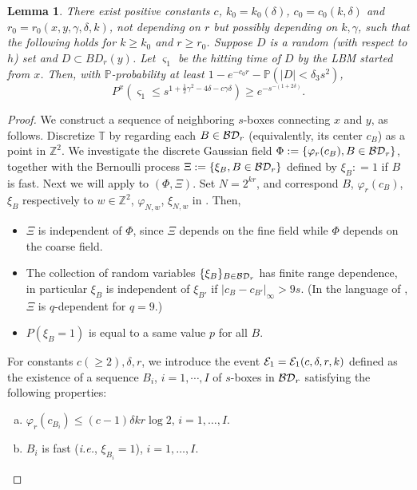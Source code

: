 \documentclass[11pt]{article}
\newtheorem{lemma}[theorem]{Lemma}
\theoremstyle{definition}
\def \BD {{\cal BD}}
\def \d {\delta}
\def \P {{\mathbb{P}}}
\def \T {{\mathbb{T}}}
\def \ee {{\cal E}}
\def \Z {{\mathbb{Z}}}
\begin{document}
 \begin{lemma} \label{Lemma.hitlastbox}
There exist positive constants
$c$, $k_0 = k_0 (\d)$,
$c_0 = c_0 (k, \d)$ and $r_0 = r_0 (x,y, \gamma, \d, k )$,
not depending on $r$ but possibly depending on $k,\gamma$,
such that the following holds for $k \ge k_0$ and $r \ge r_0$.
Suppose $D$ is a random (with respect to $h$) set and $D \subset BD_r (y)$.
Let $\varsigma_1$ be the hitting time of $D$ by the LBM started from $x$.
Then, with $\P$-probability at least $1 - e^{- c_0 r} - \P ( |D| < \d_3 s^2)$,
 \begin{equation} \label{Eq.theta1}
P^x ( \varsigma_1 \le s^{1 + \frac 1 2 \gamma^2 - 4 \d - c \gamma \d } )  \ge e^{- s^{-(1+2 \d ) }} .
 \end{equation}
 \end{lemma}
 \begin{proof}
We construct a sequence of neighboring $s$-boxes connecting $x$ and $y$, as follows. Discretize $\T$ by regarding each $B \in \BD_r$ (equivalently, its center $c_B$) as a point in $\Z^2$. We investigate the discrete Gaussian field $\Phi: = \{ \varphi_r (c_B), B \in \BD_r \}$, together with the Bernoulli process $\Xi : =\{ \xi_B, B \in \BD_r \}$ defined by $\xi_B : = 1$ if $B$ is fast. Next we will apply \cite[Theorem~1.7]{DZ15} to $(\Phi, \Xi)$. Set $N = 2^{kr}$, and correspond $B$, $\varphi_r (c_B)$, $\xi_B$ respectively to $w \in \Z^2$, $\varphi_{N, w}$, $\xi_{N, w}$ in \cite{DZ15}. Then,
 \begin{itemize}
\item $\Xi$ is independent of $\Phi$, since $\Xi$ depends on the fine field while $\Phi$ depends on the coarse field.
\item The collection of random variables $\{\xi_B \}_{B\in \BD_r}$ has finite range dependence, in particular $\xi_B$ is independent of $\xi_{B'} $ if $|c_B-c_{B'}|_\infty > 9 s$. (In the language of \cite{DZ15}, $\Xi$ is $q$-dependent for $q = 9$.)
\item $P(\xi_B = 1)$ is equal to a same value $p$ for all $B$.
 \end{itemize}
For constants $c (\geq 2),\d,r$, we introduce the event $\ee_1 = \ee_1 (c,\d,r,k)$ defined as the existence of a sequence $B_i$,
$i=1,\cdots,I$ of $s$-boxes in $\BD_r$ satisfying the following properties:
 \begin{enumerate}[(a)]
\item $\varphi_r (c_{B_i}) \le (c-1) \d k r \log 2$, $i=1,\ldots,I$.
\item $B_i$ is fast ({\em i.e.}, $\xi_{B_i} = 1$), $i=1,\ldots,I$.

\end{enumerate}
\end{proof}
\end{document}
